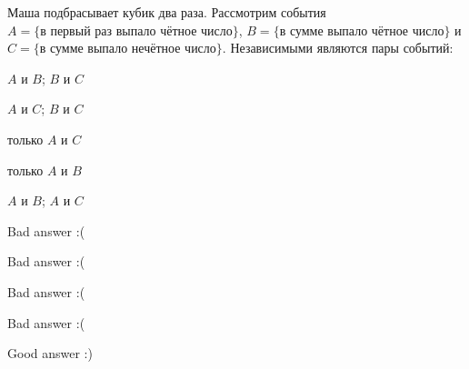 
\begin{question}
Маша подбрасывает кубик два раза. Рассмотрим события
\(A = \{\text{в первый раз выпало чётное число}\}\),
\(B = \{\text{в сумме выпало чётное число}\}\) и
\(C=\{\text{в сумме выпало нечётное число}\}\). Независимыми являются
пары событий:
\begin{answerlist}
  \item \(A\) и \(B\); \(B\) и \(C\)
  \item \(A\) и \(C\); \(B\) и \(C\)
  \item только \(A\) и \(C\)
  \item только \(A\) и \(B\)
  \item \(A\) и \(B\); \(A\) и \(C\)
\end{answerlist}
\end{question}

\begin{solution}
\begin{answerlist}
  \item Bad answer :(
  \item Bad answer :(
  \item Bad answer :(
  \item Bad answer :(
  \item Good answer :)
\end{answerlist}
\end{solution}

